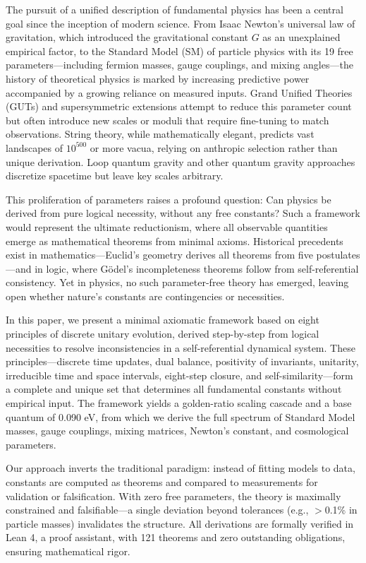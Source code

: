\documentclass[twocolumn,prd,amsmath,amssymb,aps,superscriptaddress,nofootinbib]{revtex4-2}
\begin{document}
The pursuit of a unified description of fundamental physics has been a central goal since the inception of modern science. From Isaac Newton's universal law of gravitation, which introduced the gravitational constant $G$ as an unexplained empirical factor, to the Standard Model (SM) of particle physics with its 19 free parameters—including fermion masses, gauge couplings, and mixing angles—the history of theoretical physics is marked by increasing predictive power accompanied by a growing reliance on measured inputs. Grand Unified Theories (GUTs) and supersymmetric extensions attempt to reduce this parameter count but often introduce new scales or moduli that require fine-tuning to match observations. String theory, while mathematically elegant, predicts vast landscapes of $10^{500}$ or more vacua, relying on anthropic selection rather than unique derivation. Loop quantum gravity and other quantum gravity approaches discretize spacetime but leave key scales arbitrary.

This proliferation of parameters raises a profound question: Can physics be derived from pure logical necessity, without any free constants? Such a framework would represent the ultimate reductionism, where all observable quantities emerge as mathematical theorems from minimal axioms. Historical precedents exist in mathematics—Euclid's geometry derives all theorems from five postulates—and in logic, where Gödel's incompleteness theorems follow from self-referential consistency. Yet in physics, no such parameter-free theory has emerged, leaving open whether nature's constants are contingencies or necessities.

In this paper, we present a minimal axiomatic framework based on eight principles of discrete unitary evolution, derived step-by-step from logical necessities to resolve inconsistencies in a self-referential dynamical system. These principles—discrete time updates, dual balance, positivity of invariants, unitarity, irreducible time and space intervals, eight-step closure, and self-similarity—form a complete and unique set that determines all fundamental constants without empirical input. The framework yields a golden-ratio scaling cascade and a base quantum of 0.090 eV, from which we derive the full spectrum of Standard Model masses, gauge couplings, mixing matrices, Newton's constant, and cosmological parameters.

Our approach inverts the traditional paradigm: instead of fitting models to data, constants are computed as theorems and compared to measurements for validation or falsification. With zero free parameters, the theory is maximally constrained and falsifiable—a single deviation beyond tolerances (e.g., $>$0.1\% in particle masses) invalidates the structure. All derivations are formally verified in Lean 4, a proof assistant, with 121 theorems and zero outstanding obligations, ensuring mathematical rigor.
\end{document}
